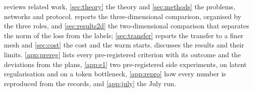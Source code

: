  reviews related work, \cref{sec:theory} the theory and
\cref{sec:methods} the problems, networks and protocol.  reports the
three-dimensional comparison, organised by the three roles, and \cref{sec:results2d} the
two-dimensional comparison that separates the norm of the loss from the labels;
\cref{sec:transfer} reports the transfer to a finer mesh and \cref{sec:cost} the cost and
the warm starts.  discusses the results and their limits.
\ref{app:prereg} lists every pre-registered criterion with its outcome and the deviations
from the plans, \ref{app:e1} two pre-registered side experiments, on latent regularisation
and on a token bottleneck, \ref{app:repro} how every number is reproduced from the records,
and \ref{app:july} the July run.
